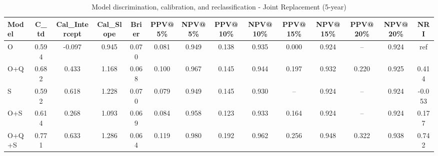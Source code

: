 \begin{table}[htbp]
\centering
\small
\caption{Model discrimination, calibration, and reclassification - Joint Replacement (5-year)}
\label{tab:perf_joint_5y}
\begin{tabular}{lccccccccccccc}
\toprule
Model & C\_td & Cal\_Intercept & Cal\_Slope & Brier & PPV@5\% & NPV@5\% & PPV@10\% & NPV@10\% & PPV@15\% & NPV@15\% & PPV@20\% & NPV@20\% & NRI \\
\midrule
O & 0.594 & -0.097 & 0.945 & 0.070 & 0.081 & 0.949 & 0.138 & 0.935 & 0.000 & 0.924 & -- & 0.924 & ref \\
O+Q & 0.682 & 0.433 & 1.168 & 0.068 & 0.100 & 0.967 & 0.145 & 0.944 & 0.197 & 0.932 & 0.220 & 0.925 & 0.414 \\
S & 0.592 & 0.618 & 1.228 & 0.070 & 0.079 & 0.949 & 0.145 & 0.930 & -- & 0.924 & -- & 0.924 & -0.053 \\
O+S & 0.614 & 0.268 & 1.093 & 0.069 & 0.084 & 0.958 & 0.123 & 0.933 & 0.164 & 0.924 & -- & 0.924 & 0.177 \\
O+Q+S & 0.771 & 0.633 & 1.286 & 0.064 & 0.119 & 0.980 & 0.192 & 0.962 & 0.256 & 0.948 & 0.322 & 0.938 & 0.742 \\
\bottomrule
\end{tabular}
\end{table}